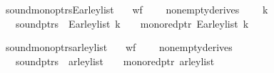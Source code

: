 \begin{isabellebody}
{\isafoldproof}%
%
\isadelimproof
%
\endisadelimproof
%
\begin{isamarkuptext}%
%
\end{isamarkuptext}\isamarkuptrue%
\isamarkupfalse%
\ sound{\isacharunderscore}{\kern0pt}mono{\isacharunderscore}{\kern0pt}ptrs{\isacharunderscore}{\kern0pt}Earley{\isacharunderscore}{\kern0pt}list{\isacharcolon}{\kern0pt}\isanewline
\ \ \ {\isachardoublequoteopen}wf{\isacharunderscore}{\kern0pt}{\isasymG}\ {\isasymG}{\isachardoublequoteclose}\isanewline
\ \ \ {\isachardoublequoteopen}nonempty{\isacharunderscore}{\kern0pt}derives\ {\isasymG}{\isachardoublequoteclose}\isanewline
\ \ \ {\isachardoublequoteopen}k\ {\isasymle}\ {\isacharbar}{\kern0pt}{\isasymomega}{\isacharbar}{\kern0pt}{\isachardoublequoteclose}\isanewline
\ \ \ {\isachardoublequoteopen}sound{\isacharunderscore}{\kern0pt}ptrs\ {\isasymomega}\ {\isacharparenleft}{\kern0pt}Earley{\isacharunderscore}{\kern0pt}list\ k\ {\isasymG}\ {\isasymomega}{\isacharparenright}{\kern0pt}\ {\isasymand}\ mono{\isacharunderscore}{\kern0pt}red{\isacharunderscore}{\kern0pt}ptr\ {\isacharparenleft}{\kern0pt}Earley{\isacharunderscore}{\kern0pt}list\ k\ {\isasymG}\ {\isasymomega}{\isacharparenright}{\kern0pt}{\isachardoublequoteclose}%
\isadelimproof
%
\endisadelimproof
%
\isatagproof
%
\endisatagproof
{\isafoldproof}%
%
\isadelimproof
%
\endisadelimproof
%
\begin{isamarkuptext}%
%
\end{isamarkuptext}\isamarkuptrue%
\isamarkupfalse%
\ sound{\isacharunderscore}{\kern0pt}mono{\isacharunderscore}{\kern0pt}ptrs{\isacharunderscore}{\kern0pt}{\isasymE}arley{\isacharunderscore}{\kern0pt}list{\isacharcolon}{\kern0pt}\isanewline
\ \ \ {\isachardoublequoteopen}wf{\isacharunderscore}{\kern0pt}{\isasymG}\ {\isasymG}{\isachardoublequoteclose}\isanewline
\ \ \ {\isachardoublequoteopen}nonempty{\isacharunderscore}{\kern0pt}derives\ {\isasymG}{\isachardoublequoteclose}\isanewline
\ \ \ {\isachardoublequoteopen}sound{\isacharunderscore}{\kern0pt}ptrs\ {\isasymomega}\ {\isacharparenleft}{\kern0pt}{\isasymE}arley{\isacharunderscore}{\kern0pt}list\ {\isasymG}\ {\isasymomega}{\isacharparenright}{\kern0pt}\ {\isasymand}\ mono{\isacharunderscore}{\kern0pt}red{\isacharunderscore}{\kern0pt}ptr\ {\isacharparenleft}{\kern0pt}{\isasymE}arley{\isacharunderscore}{\kern0pt}list\ {\isasymG}\ {\isasymomega}{\isacharparenright}{\kern0pt}{\isachardoublequoteclose}%

\end{isabellebody}
